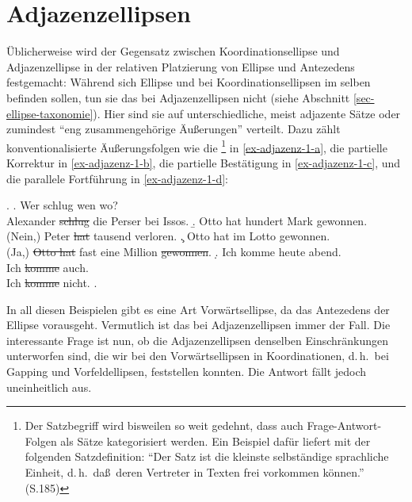 \section{Adjazenzellipsen} \label{sec-adjazenzellipsen}

Üblicherweise wird der Gegensatz zwischen Koordinationsellipse und Adjazenzellipse in der relativen Platzierung von Ellipse und Antezedens festgemacht: Während sich Ellipse und  bei Koordinationsellipsen im selben  befinden sollen, tun sie das bei Adjazenzellipsen nicht (siehe Abschnitt \ref{sec-ellipse-taxonomie}). Hier sind sie auf unterschiedliche, meist adjazente Sätze oder zumindest "`eng zusammengehörige Äu\ss erungen"' \citep[768]{Klein:93} verteilt. Dazu zählt \cite{Klein:93} konventionalisierte Äu\ss erungsfolgen wie die \footnote{Der Satzbegriff wird bisweilen so weit gedehnt, dass auch Frage-Antwort-Folgen als Sätze kategorisiert werden. Ein Beispiel dafür liefert \cite{Kindt:85} mit der folgenden Satzdefinition: "`Der Satz ist die kleinste selbständige sprachliche Einheit, d.\,h.\ da\ss \ deren Vertreter in Texten frei vorkommen können."' (S.185)} in \ref{ex-adjazenz-1-a}, die partielle Korrektur in \ref{ex-adjazenz-1-b}, die partielle Bestätigung in \ref{ex-adjazenz-1-c}, und die parallele Fortführung in \ref{ex-adjazenz-1-d}:  

\ex. \label{ex-adjazenz-1}
\a. \label{ex-adjazenz-1-a} Wer schlug wen wo? \\
Alexander \sout{schlug} die Perser bei Issos.
\b. \label{ex-adjazenz-1-b} Otto hat hundert Mark gewonnen.\\
(Nein,) Peter \sout{hat} tausend verloren.
\c. \label{ex-adjazenz-1-c} Otto hat im Lotto gewonnen. \\
(Ja,) \sout{Otto hat} fast eine Million \sout{gewonnen}.
\d. \label{ex-adjazenz-1-d} Ich komme heute abend. \\
Ich \sout{komme} auch. \\
Ich \sout{komme} nicht.
\z. \citep[768]{Klein:93} 

In all diesen Beispielen gibt es eine Art Vorwärtsellipse, da das Antezedens der Ellipse vorausgeht. Vermutlich ist das bei Adjazenzellipsen immer der Fall. Die interessante Frage ist nun, ob die Adjazenzellipsen denselben Einschränkungen unterworfen sind, die wir bei den Vorwärtsellipsen in Koordinationen, d.\,h.\ bei Gapping und Vorfeldellipsen, feststellen konnten. Die Antwort fällt jedoch uneinheitlich aus. 

